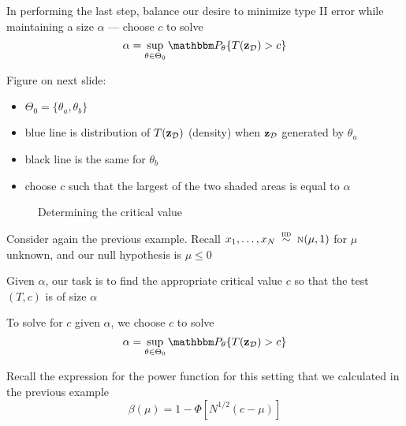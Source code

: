 \begin{frame}

    \vspace{2em}
    In performing the last step, balance our desire to minimize type II
    error while maintaining a size $\alpha$ --- choose $c$ to solve
    \begin{equation}
        \alpha = \sup_{\theta \in \Theta_0} \PP_{\theta}\{T(\zdata) > c\}
    \end{equation}
    
    \vspace{.7em}
    Figure on next slide:
    \begin{itemize}
        \item $\Theta_0=\{\theta_a, \theta_b\}$
        \item  blue line is distribution of $T(\mathbf{z}_{\mathcal D})$ (density) 
                when $\mathbf{z}_{\mathcal D}$ generated by $\theta_a$
        \item  black line is the same for
                $\theta_b$
        \item choose $c$ such that the largest of the two shaded
            areas is equal to $\alpha$
    \end{itemize}
    
\end{frame}

\begin{frame}
    
    \begin{figure}
       \begin{center}
        \caption{\label{f:c_alpha} Determining the critical value}
       \end{center}
    \end{figure}


\end{frame}

\begin{frame}

    \vspace{2em}
    \Eg
    Consider again the previous example. Recall $x_1,\ldots,x_N
    \stackrel {\textrm{ {\sc iid }}} {\sim} \textrm{\sc n}(\mu, 1)$ for $\mu$ unknown, and our null hypothesis is
    $\mu \leq 0$
    
    Given $\alpha$, our task is to find the appropriate critical
    value $c$ so that the test $(T,c)$ is of size $\alpha$
    
    \vspace{.7em}
    To solve for $c$ given $\alpha$, we choose $c$ to solve 
    \begin{equation}
        \label{eq:solfc}
        \alpha = \sup_{\theta \in \Theta_0} \PP_{\theta}\{T(\zdata) > c\}
    \end{equation}
    
    Recall the expression for the power function for this setting that
    we calculated in the previous example
    \begin{equation}
    \beta(\mu) = 1 - \Phi[N^{1/2}(c - \mu)]
    \end{equation}
    
\end{frame}

